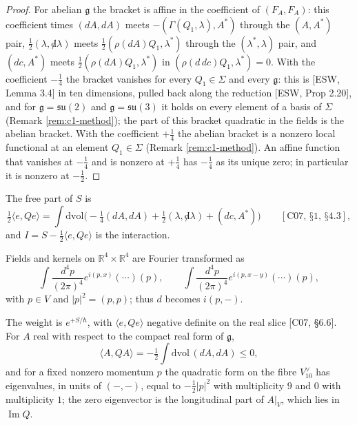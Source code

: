 \begin{proof}
For abelian $\mathfrak g$ the bracket is affine in the coefficient of $(F_A,F_A)$: this coefficient times $(dA,dA)$ meets $-(\Gamma(Q_1,\lambda),A^*)$ through the $(A,A^*)$ pair, $\tfrac12(\lambda,{\not d}\lambda)$ meets $\tfrac12(\rho(dA)Q_1,\lambda^*)$ through the $(\lambda^*,\lambda)$ pair, and $(dc,A^*)$ meets $\tfrac12(\rho(dA)Q_1,\lambda^*)$ in $(\rho(d\,dc)Q_1,\lambda^*)=0$. With the coefficient $-\tfrac14$ the bracket vanishes for every $Q_1\in\Sigma$ and every $\mathfrak g$: this is [ESW, Lemma 3.4] in ten dimensions, pulled back along the reduction [ESW, Prop 2.20], and for $\mathfrak g=\mathfrak{su}(2)$ and $\mathfrak g=\mathfrak{su}(3)$ it holds on every element of a basis of $\Sigma$ (Remark \ref{rem:c1-method}); the part of this bracket quadratic in the fields is the abelian bracket. With the coefficient $+\tfrac14$ the abelian bracket is a nonzero local functional at an element $Q_1\in\Sigma$ (Remark \ref{rem:c1-method}). An affine function that vanishes at $-\tfrac14$ and is nonzero at $+\tfrac14$ has $-\tfrac14$ as its unique zero; in particular it is nonzero at $-\tfrac12$.
\end{proof}

The free part of $S$ is
\begin{equation}
\tfrac12\langle e,Qe\rangle=\int\mathrm{dvol}\Big(-\tfrac14(dA,dA)+\tfrac12(\lambda,{\not d}\lambda)+(dc,A^*)\Big)\qquad[\text{C07, §1, §4.3}],
\label{eq:c1-free}
\end{equation}
and $I=S-\tfrac12\langle e,Qe\rangle$ is the interaction.

Fields and kernels on $\mathbb R^4\times\mathbb R^4$ are Fourier transformed as
\[
\int\frac{d^4p}{(2\pi)^4}e^{i(p,x)}(\cdots)(p),\qquad \int\frac{d^4p}{(2\pi)^4}e^{i(p,x-y)}(\cdots)(p),
\]
with $p\in V$ and $|p|^2=(p,p)$; thus $d$ becomes $i(p,-)$.

\begin{remark}
\label{rem:c1-real}
The weight is $e^{+S/\hbar}$, with $\langle e,Qe\rangle$ negative definite on the real slice [C07, §6.6]. For $A$ real with respect to the compact real form of $\mathfrak g$,
\[
\langle A,QA\rangle=-\tfrac12\int\mathrm{dvol}\,(dA,dA)\le0,
\]
and for a fixed nonzero momentum $p$ the quadratic form on the fibre $V_{10}^\vee$ has eigenvalues, in units of $(-,-)$, equal to $-\tfrac12|p|^2$ with multiplicity $9$ and $0$ with multiplicity $1$; the zero eigenvector is the longitudinal part of $A|_V$, which lies in $\operatorname{Im}Q$.
\end{remark}

